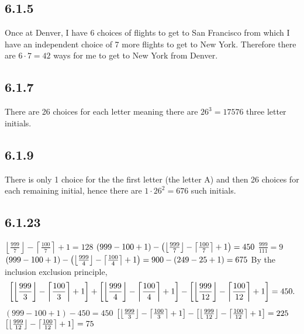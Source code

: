 \documentclass[12pt,titlepage]{extarticle}
\begin{document}

\subsection*{6.1.5}
Once at Denver, I have 6 choices of flights to get to San Francisco from which I have an independent choice of 7 more flights to get to New York. Therefore there are $6 \cdot 7 = 42$ ways for me to get to New York from Denver.

\subsection*{6.1.7}
There are 26 choices for each letter meaning there are $26^3 = 17576$ three letter initials.

\subsection*{6.1.9}
There is only 1 choice for the the first letter (the letter A) and then 26 choices for each remaining initial, hence there are $1 \cdot 26^2 = 676$ such initials.

\subsection*{6.1.23}
\begin{tasks}
    \task $\left\lfloor \frac{999}{7} \right\rfloor - \left\lceil \frac{100}{7} \right\rceil + 1 = 128$
    \task $(999 - 100 + 1) - \qty(\left\lfloor \frac{999}{7} \right\rfloor - \left\lceil \frac{100}{7} \right\rceil + 1) = 450$
    \task $\frac{999}{111} = 9$
    \task $(999 - 100 + 1) - \qty(\left\lfloor \frac{999}{4} \right\rfloor - \left\lceil \frac{100}{4} \right\rceil + 1) = 900 - (249 - 25 + 1) = 675$
    \task By the inclusion exclusion principle,
    \[
        \qty[\left\lfloor \frac{999}{3} \right\rfloor - \left\lceil \frac{100}{3} \right\rceil + 1] + \qty[\left\lfloor \frac{999}{4} \right\rfloor - \left\lceil \frac{100}{4} \right\rceil + 1] - \qty[\left\lfloor \frac{999}{12} \right\rfloor - \left\lceil \frac{100}{12} \right\rceil + 1] = 450
    .\]
    \task $(999 - 100 + 1) - 450 = 450$
    \task $\qty[\left\lfloor \frac{999}{3} \right\rfloor - \left\lceil \frac{100}{3} \right\rceil + 1] - \qty[\left\lfloor \frac{999}{12} \right\rfloor - \left\lceil \frac{100}{12} \right\rceil + 1] = 225$
    \task $\qty[\left\lfloor \frac{999}{12} \right\rfloor - \left\lceil \frac{100}{12} \right\rceil + 1] = 75$
\end{tasks}
\end{document}
